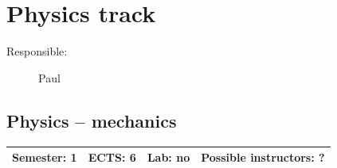 \documentclass[12pt,twoside,fleqn,a4paper]{article}
\begin{document}
\newpage
\section{Physics track}
\begin{description}
\item[Responsible:] Paul
\end{description}
\vspace{1 mm}


\subsection{Physics -- mechanics}
\begin{tabular}{llll} \hline
\textbf{Semester:} 1 & \textbf{ECTS:} 6 & \textbf{Lab:} no & \textbf{Possible instructors:} ?\\
\hline
\end{tabular}
\end{document}
